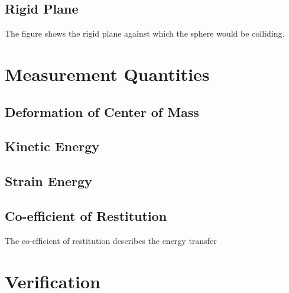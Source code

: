 \subsection{Rigid Plane}

The figure shows the rigid plane against which the sphere would be colliding. 

\section{Measurement Quantities}

\subsection{Deformation of Center of Mass}

\subsection{Kinetic Energy}

\subsection{Strain Energy}

\subsection{Co-efficient of Restitution}

The co-efficient of restitution describes the energy transfer 	 

\section{Verification}
